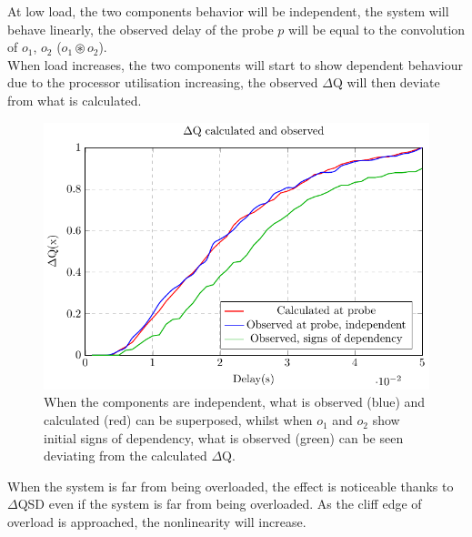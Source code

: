         At low load, the two components behavior will be independent, the system will behave linearly, the observed delay of the probe $p$ will be equal to the convolution of $o_1$, $o_2$ ($o_1 \circledast o_2$). \\
        
        When load increases, the two components will start to show dependent behaviour due to the processor utilisation increasing, the observed $\Delta$Q will then deviate from what is calculated.
        \begin{figure}[H]
            \begin{center}
                \includegraphics[scale=1]{tikz/cdf_indep.pdf}
            \end{center}
            \caption{When the components are independent, what is observed (blue) and calculated (red) can be superposed, whilst when $o_1$ and $o_2$ show initial signs of dependency, what is observed (green) can be seen deviating from the calculated $\Delta$Q.}
        \end{figure}

        When the system is far from being overloaded, the effect is noticeable thanks to $\Delta$QSD even if the system is far from being overloaded. As the cliff edge of overload is approached, the nonlinearity will increase.
